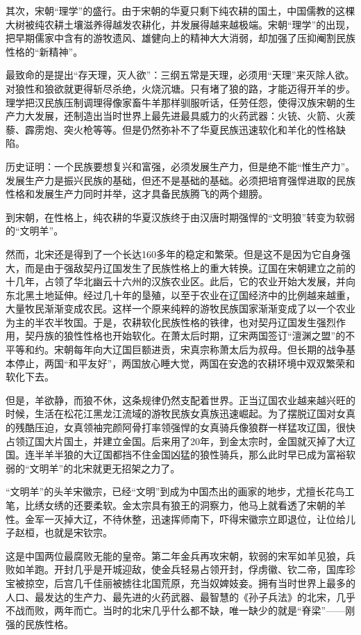 \par 其次，宋朝“理学”的盛行。由于宋朝的华夏只剩下纯农耕的国土，中国儒教的这棵大树被纯农耕土壤滋养得越发农耕化，并发展得越来越极端。宋朝“理学”的出现，把早期儒家中含有的游牧遗风、雄健向上的精神大大消弱，却加强了压抑阉割民族性格的“新精神”。
\par 最致命的是提出“存天理，灭人欲”：三纲五常是天理，必须用“天理”来灭除人欲。对狼性和狼欲就更得斩尽杀绝，火烧沉塘。只有堵了狼的路，才能迈得开羊的步。理学把汉民族压制调理得像家畜牛羊那样驯服听话，任劳任怨，使得汉族宋朝的生产力大发展，还制造出当时世界上最先进最具威力的火药武器：火铳、火箭、火蒺藜、霹雳炮、突火枪等等。但是仍然弥补不了华夏民族迅速软化和羊化的性格缺陷。
\par 历史证明：一个民族要想复兴和富强，必须发展生产力，但是绝不能“惟生产力”。发展生产力是振兴民族的基础，但还不是基础的基础。必须把培育强悍进取的民族性格和发展生产力同时并举，这才具备民族腾飞的两个翅膀。
\par 到宋朝，在性格上，纯农耕的华夏汉族终于由汉唐时期强悍的“文明狼”转变为软弱的“文明羊”。
\par 然而，北宋还是得到了一个长达160多年的稳定和繁荣。但是这不是因为它自身强大，而是由于强敌契丹辽国发生了民族性格上的重大转换。辽国在宋朝建立之前的十几年，占领了华北幽云十六州的汉族农业区。此后，它的农业开始大发展，并向东北黑土地延伸。经过几十年的垦殖，以至于农业在辽国经济中的比例越来越重，大量牧民渐渐变成农民。这样一个原来纯粹的游牧民族国家渐渐变成了以一个农业为主的半农半牧国。于是，农耕软化民族性格的铁律，也对契丹辽国发生强烈作用，契丹族的狼性性格也开始软化。在萧太后时期，辽宋两国签订“澶渊之盟”的不平等和约。宋朝每年向大辽国巨额进贡，宋真宗称萧太后为叔母。但长期的战争基本停止，两国“和平友好”，两国放心睡大觉，两国在安逸的农耕环境中双双繁荣和软化下去。
\par 但是，羊欲静，而狼不休，这条规律仍然支配着世界。正当辽国农业越来越兴旺的时候，生活在松花江黑龙江流域的游牧民族女真族迅速崛起。为了摆脱辽国对女真的残酷压迫，女真领袖完颜阿骨打率领强悍的女真骑兵像狼群一样猛攻辽国，很快占领辽国大片国土，并建立金国。后来用了20年，到金太宗时，金国就灭掉了大辽国。连半羊半狼的大辽国都挡不住金国凶猛的狼性骑兵，那么此时早已成为富裕软弱的“文明羊”的北宋就更无招架之力了。
\par “文明羊”的头羊宋徽宗，已经“文明”到成为中国杰出的画家的地步，尤擅长花鸟工笔，比绣女绣的还要柔软。金太宗具有狼王的洞察力，他马上就看透了宋朝的羊性。金军一灭掉大辽，不待休整，迅速挥师南下，吓得宋徽宗立即退位，让位给儿子赵桓，也就是宋钦宗。
\par 这是中国两位最腐败无能的皇帝。第二年金兵再攻宋朝，软弱的宋军如羊见狼，兵败如羊跑。开封几乎是开城迎敌，使金兵轻易占领开封，俘虏徽、钦二帝，国库珍宝被掠空，后宫几千佳丽被掳往北国荒原，充当奴婢妓妾。拥有当时世界上最多的人口、最发达的生产力、最先进的火药武器、最智慧的《孙子兵法》的北宋，几乎不战而败，两年而亡。当时的北宋几乎什么都不缺，唯一缺少的就是“脊梁”——刚强的民族性格。
